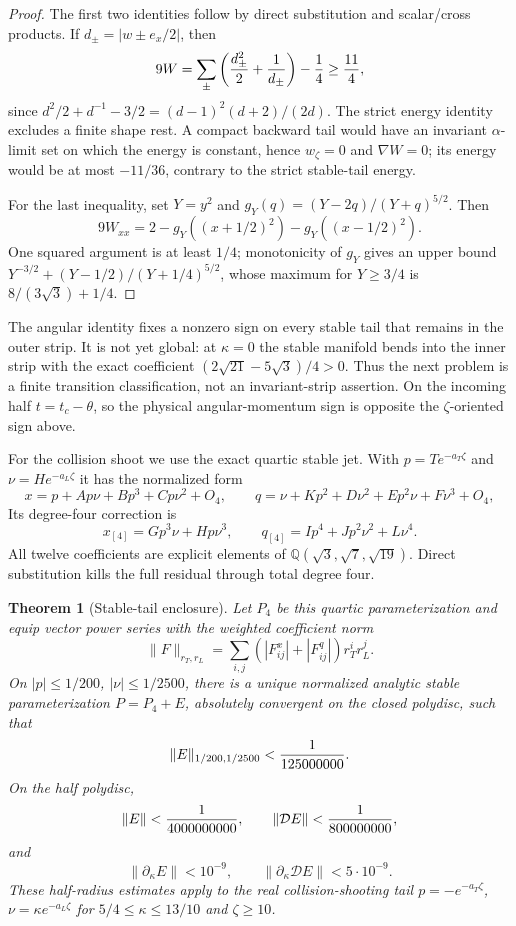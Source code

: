 \documentclass[11pt]{article}
\newtheorem{theorem}{Theorem}
\begin{document}
\begin{proof}
The first two identities follow by direct substitution and scalar/cross
products. If $d_\pm=|w\pm e_x/2|$, then
\[
 9W=\sum_\pm\left({d_\pm^2\over2}+{1\over d_\pm}\right)-{1\over4}
 \ge {11\over4},
\]
since
$d^2/2+d^{-1}-3/2=(d-1)^2(d+2)/(2d)$. The strict energy identity excludes a
finite shape rest. A compact backward tail would have an invariant
$\alpha$-limit set on which the energy is constant, hence
$w_\zeta=0$ and $\nabla W=0$; its energy would be at most $-11/36$, contrary
to the strict stable-tail energy.

For the last inequality, set $Y=y^2$ and
$g_Y(q)=(Y-2q)/(Y+q)^{5/2}$. Then
\[
 9W_{xx}=2-g_Y((x+1/2)^2)-g_Y((x-1/2)^2).
\]
One squared argument is at least $1/4$; monotonicity of $g_Y$ gives an upper
bound
$Y^{-3/2}+(Y-1/2)/(Y+1/4)^{5/2}$, whose maximum for $Y\ge3/4$ is
$8/(3\sqrt3)+1/4$.
\end{proof}

The angular identity fixes a nonzero sign on every stable tail that remains
in the outer strip. It is not yet global: at $\kappa=0$ the stable manifold
bends into the inner strip with the exact coefficient
$(2\sqrt{21}-5\sqrt3)/4>0$. Thus the next problem is a finite transition
classification, not an invariant-strip assertion. On the incoming half
$t=t_c-\theta$, so the physical angular-momentum sign is opposite the
$\zeta$-oriented sign above.

For the collision shoot we use the exact quartic stable jet. With
$p=Te^{-a_T\zeta}$ and $\nu=He^{-a_L\zeta}$ it has the normalized form
\[
 x=p+Ap\nu+Bp^3+Cp\nu^2+O_4,\qquad
 q=\nu+Kp^2+D\nu^2+Ep^2\nu+F\nu^3+O_4,
\]
Its degree-four correction is
\[
 x_{[4]}=Gp^3\nu+Hp\nu^3,\qquad
 q_{[4]}=Ip^4+Jp^2\nu^2+L\nu^4.
\]
All twelve coefficients are explicit elements of
$\mathbb Q(\sqrt3,\sqrt7,\sqrt{19})$. Direct substitution kills the full
residual through total degree four.

\begin{theorem}[Stable-tail enclosure]
Let $P_4$ be this quartic parameterization and equip vector power series with
the weighted coefficient norm
\[
 \|F\|_{r_T,r_L}=\sum_{i,j}(|F^x_{ij}|+|F^q_{ij}|)r_T^ir_L^j.
\]
On $|p|\le1/200$, $|\nu|\le1/2500$, there is a unique normalized analytic
stable parameterization $P=P_4+E$, absolutely convergent on the closed
polydisc, such that
\[
 \|E\|_{1/200,1/2500}< {1\over125000000}.
\]
On the half polydisc,
\[
 \|E\|<{1\over4000000000},\qquad
 \|\mathcal DE\|<{1\over800000000},
\]
and
\[
 \|\partial_\kappa E\|<10^{-9},\qquad
 \|\partial_\kappa\mathcal DE\|<5\cdot10^{-9}.
\]
These half-radius estimates apply to the real collision-shooting tail
$p=-e^{-a_T\zeta}$, $\nu=\kappa e^{-a_L\zeta}$ for
$5/4\le\kappa\le13/10$ and $\zeta\ge10$.
\end{theorem}
\end{document}
